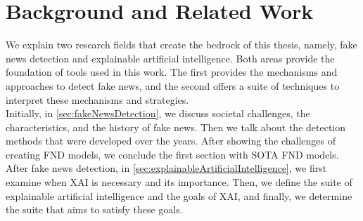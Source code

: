 
\chapter{Background and Related Work}\label{chapter:background}

We explain two research fields that create the bedrock of this thesis, namely, fake news detection and
explainable artificial intelligence. Both areas provide the foundation of tools used in this work. The first
provides the mechanisms and approaches to detect fake news, and the second offers a suite of techniques to interpret these mechanisms and strategies.\\
Initially, in \ref{sec:fakeNewsDetection}, we discuss societal challenges, the characteristics, and the history of fake news. Then we talk about the detection methods that were developed over the years. After showing the challenges of creating FND models, we conclude the first section with SOTA FND models.\\
After fake news detection, in \ref{sec:explainableArtificialIntelligence}, we first examine when XAI is necessary and its importance. Then, we define the suite of explainable artificial intelligence and the goals of XAI, and finally, we determine the suite that aims to satisfy these goals.\\
